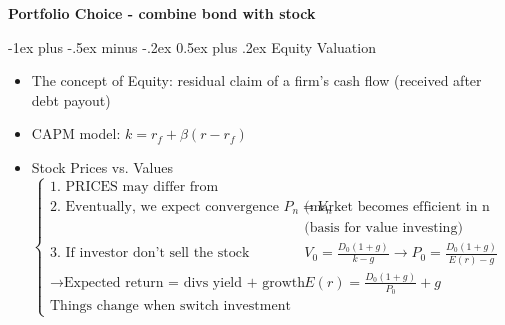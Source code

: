 \documentclass[10pt,landscape]{article}
\makeatletter
\renewcommand{\section}{\@startsection{section}{1}{0mm}%
                                {-1ex plus -.5ex minus -.2ex}%
                                {0.5ex plus .2ex}%
                                {\normalfont\large\bfseries}}
\makeatother
\begin{document}
\newpage
    \begin{center}
         \Large{\textbf{Portfolio Choice - combine bond with stock}} \\
    \end{center}

    \begin{multicols}{2}
	\setlength{\premulticols}{1pt}
	\setlength{\postmulticols}{1pt}
	\setlength{\multicolsep}{1pt}
	\setlength{\columnsep}{2pt}

    \section{Equity Valuation}
    \begin{itemize}
        \item The concept of {\color{red}Equity}: residual claim of a firm's cash flow (received after debt payout)
        \item CAPM model: $k = r_f +\beta(r-r_f)$ 
        \item Stock Prices vs. Values \\
        	$
            \begin{cases}
                \text{1. PRICES may differ from fundamental VALUES}\\
                \text{2. Eventually, we expect convergence $P_n = V_n$}& \text{(market becomes efficient in n years)}\\
                \text{}& \text{(basis for value investing)}\\
                \text{3. If investor don't sell the stock} & \displaystyle V_0=\frac{D_0(1+g)}{k-g} \rightarrow \displaystyle P_0=\frac{D_0(1+g)}{E(r)-g}\\
                \rightarrow \text{Expected return = divs yield + growth in divs} & \displaystyle E(r)=\frac{D_0(1+g)}{P_0}+g\\
                \text{Things change when switch investment horizon}
            \end{cases}
            $

    \end{itemize}


\end{multicols}
\end{document}

